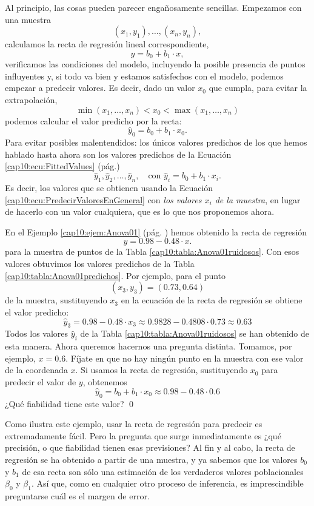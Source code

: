Al principio, las cosas pueden parecer engañosamente sencillas. Empezamos con una muestra
\[(x_1,y_1),\ldots,(x_n,y_n),\]
calculamos la recta de regresión lineal correspondiente,
\[y=b_0+b_1\cdot x,\]
verificamos las condiciones del modelo, incluyendo la posible presencia de puntos influyentes y, si todo va bien y estamos satisfechos con el modelo, podemos empezar a predecir valores. Es decir, dado un valor $x_0$ que cumpla, para evitar la extrapolación,
\[\min(x_1,\ldots,x_n)< x_0 <\max(x_1,\ldots,x_n)\]
podemos calcular el {\sf valor predicho} por la recta:
\begin{equation}
    \label{cap10:ecu:PredecirValoresEnGeneral}
    \hat y_0= b_0+b_1\cdot x_0.
\end{equation}
Para evitar posibles malentendidos: los únicos valores predichos de los que hemos hablado hasta ahora son los valores predichos de la Ecuación \ref{cap10:ecu:FittedValues} (pág.)
\[\hat y_1,\hat y_2,\ldots,\hat y_n,\quad\mbox{con }\hat y_i=b_0+b_1\cdot x_i.\]
Es decir, los valores que se obtienen usando la Ecuación \ref{cap10:ecu:PredecirValoresEnGeneral} con {\em los valores $x_i$ de la muestra}, en lugar de hacerlo con un valor cualquiera, que es lo que nos proponemos ahora.
\begin{ejemplo}
\label{cap10:ejem:PrediccionRegresion01}
En el Ejemplo \ref{cap10:ejem:Anova01}  (pág. \pageref{cap10:ejem:Anova01}) hemos obtenido la recta de regresión
\[y=0.98-0.48\cdot x.\]
para la muestra de puntos de la Tabla \ref{cap10:tabla:Anova01ruidosos}. Con esos valores obtuvimos los valores predichos de la Tabla \ref{cap10:tabla:Anova01predichos}. Por ejemplo, para el punto
\[(x_3,y_3)=(0.73, 0.64)\]
de la muestra, sustituyendo $x_3$ en la ecuación de la recta de regresión se obtiene el valor predicho:
\[
\hat y_3=0.98-0.48\cdot x_3\approx 0.9828-0.4808\cdot 0.73\approx  0.63
\]
Todos los valores $\hat y_i$ de la Tabla \ref{cap10:tabla:Anova01ruidosos} se han obtenido de esta manera. Ahora queremos hacernos una pregunta distinta. Tomamos, por ejemplo, $x=0.6$. Fíjate en que no hay ningún punto en la muestra con ese valor de la coordenada $x$. Si usamos la recta de regresión, sustituyendo $x_0$ para predecir el valor de $y$, obtenemos
\[
\hat y_0= b_0+b_1\cdot x_0\approx 0.98-0.48\cdot 0.6
\]
¿Qué fiabilidad tiene este valor?
\qed
\end{ejemplo}
Como ilustra este ejemplo, usar la recta de regresión para predecir es extremadamente fácil. Pero la pregunta que surge inmediatamente es ¿qué precisión, o que fiabilidad tienen esas previsiones? Al fin y al cabo, la recta de regresión se ha obtenido a partir de una muestra, y ya sabemos que los valores $b_0$ y $b_1$ de esa recta son sólo una estimación de los verdaderos valores poblacionales $\beta_0$ y $\beta_1$. Así que, como en cualquier otro proceso de inferencia, es imprescindible preguntarse cuál es el margen de error.

